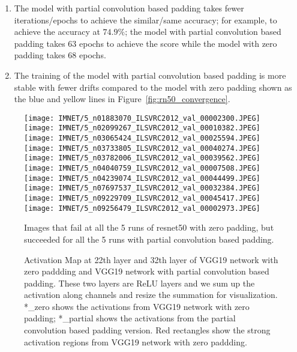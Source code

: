\documentclass[10pt,twocolumn,letterpaper]{article}
\begin{document}
\begin{enumerate}
    \item The model with partial convolution based padding takes fewer iterations/epochs to achieve the similar/same accuracy; for example, to achieve the accuracy at $74.9\%$; the model with partial convolution based padding takes 63 epochs to achieve the score while the model with zero padding takes 68 epochs.
    \item The training of the model with partial convolution based padding is more stable with fewer drifts compared to the model with zero padding shown as the blue and yellow lines in Figure~\ref{fig:rn50_convergence}.
\end{enumerate}\begin{figure*}%
    \centering
    \texttt{[image: IMNET/5\_n01883070\_ILSVRC2012\_val\_00002300.JPEG]}
    \texttt{[image: IMNET/5\_n02099267\_ILSVRC2012\_val\_00010382.JPEG]}
    \texttt{[image: IMNET/5\_n03065424\_ILSVRC2012\_val\_00025594.JPEG]}
    \texttt{[image: IMNET/5\_n03733805\_ILSVRC2012\_val\_00040274.JPEG]}
    \texttt{[image: IMNET/5\_n03782006\_ILSVRC2012\_val\_00039562.JPEG]} \\
    \texttt{[image: IMNET/5\_n04040759\_ILSVRC2012\_val\_00007508.JPEG]}
    \texttt{[image: IMNET/5\_n04239074\_ILSVRC2012\_val\_00044499.JPEG]}
    \texttt{[image: IMNET/5\_n07697537\_ILSVRC2012\_val\_00032384.JPEG]}
    \texttt{[image: IMNET/5\_n09229709\_ILSVRC2012\_val\_00045417.JPEG]}
    \texttt{[image: IMNET/5\_n09256479\_ILSVRC2012\_val\_00002973.JPEG]}
    \caption{Images that fail at all the 5 runs of resnet50 with zero padding, but succeeded for all the 5 runs with partial convolution based padding.}
    \label{fig:zero_failures}
\end{figure*}\begin{figure*}%
\caption{Activation Map at 22th layer and 32th layer of VGG19 network with zero paddding and VGG19 network with partial convolution based padding. These two layers are ReLU layers and we sum up the activation along channels and resize the summation for visualization. *\_zero shows the activations from VGG19 network with zero padding; *\_partial shows the activations from the partial convolution based padding version. Red rectangles show the strong activation regions from VGG19 network with zero paddding.}

\end{figure*}
\end{document}
